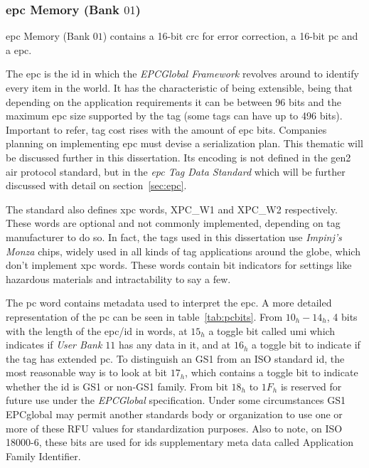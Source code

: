 \subsubsection{\ac{epc} Memory (Bank $01$)}

\ac{epc} Memory (Bank $01$) contains a 16-bit \ac{crc} for error correction, a 16-bit \ac{pc} and a \ac{epc}.

The \ac{epc} is the \ac{id} in which the \emph{EPCGlobal Framework} revolves around to identify every item in the world. It has the characteristic of being extensible, being that depending on the application requirements it can be between 96 bits and the maximum \ac{epc} size supported by the tag (some tags can have up to 496 bits). Important to refer, tag cost rises with the amount of \ac{epc} bits. Companies planning on implementing \ac{epc} must devise a serialization plan. This thematic will be discussed further in this dissertation.
Its encoding is not defined in the \ac{gen2} air protocol standard, but in the \emph{\ac{epc} Tag Data Standard} which will be further discussed with detail on section~\ref{sec:epc}.

The standard also defines \ac{xpc} words, XPC\_W1 and XPC\_W2 respectively. These words are optional and not commonly implemented, depending on tag manufacturer to do so. In fact, the tags used in this dissertation use \textit{Impinj's Monza} chips, widely used in all kinds of tag applications around the globe, which don't implement \ac{xpc} words. These words contain bit indicators for settings like hazardous materials and intractability to say a few.

The \ac{pc} word contains metadata used to interpret the \ac{epc}. A more detailed representation of the \ac{pc} can be seen in table~\ref{tab:pcbits}.
From $10_h-14_h$, 4 bits with the length of the \ac{epc}/\ac{id} in words, at $15_h$ a toggle bit called \ac{umi} which indicates if \emph{User Bank $11$} has any data in it, and at $16_h$ a toggle bit to indicate if the tag has extended \ac{pc}.
To distinguish an GS1 from an ISO standard \ac{id}, the most reasonable way is to look at bit $17_h$, which contains a toggle bit to indicate whether the \ac{id} is GS1 or non-GS1 family.
From bit $18_h$ to $1F_h$ is reserved for future use under the \emph{EPCGlobal} specification. Under some circumstances GS1 EPCglobal may permit another standards body or organization to use one or more of these RFU values for standardization purposes. Also to note, on ISO 18000-6, these bits are used for \acp{id} supplementary meta data called Application Family Identifier.

